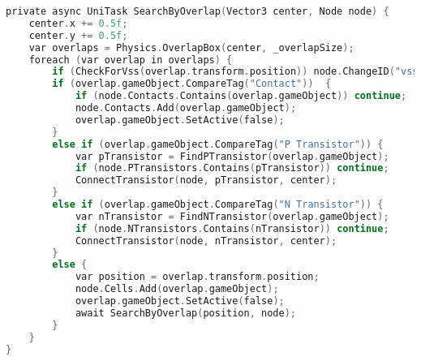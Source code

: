 \begin{lstlisting}[language={C},label=lst:search_overlap,caption={Metoda \texttt{SearchOverlap} wykrywające sąsiadujące obiekty}]
private async UniTask SearchByOverlap(Vector3 center, Node node) {
    center.x += 0.5f;
    center.y += 0.5f;
    var overlaps = Physics.OverlapBox(center, _overlapSize);
    foreach (var overlap in overlaps) {
        if (CheckForVss(overlap.transform.position)) node.ChangeID("vss");
        if (overlap.gameObject.CompareTag("Contact"))  {
            if (node.Contacts.Contains(overlap.gameObject)) continue;
            node.Contacts.Add(overlap.gameObject);
            overlap.gameObject.SetActive(false);
        }
        else if (overlap.gameObject.CompareTag("P Transistor")) {
            var pTransistor = FindPTransistor(overlap.gameObject);
            if (node.PTransistors.Contains(pTransistor)) continue;
            ConnectTransistor(node, pTransistor, center);
        }
        else if (overlap.gameObject.CompareTag("N Transistor")) {
            var nTransistor = FindNTransistor(overlap.gameObject);
            if (node.NTransistors.Contains(nTransistor)) continue;
            ConnectTransistor(node, nTransistor, center);
        }
        else {
            var position = overlap.transform.position;
            node.Cells.Add(overlap.gameObject);
            overlap.gameObject.SetActive(false);
            await SearchByOverlap(position, node);
        }
    }
}

\end{lstlisting}